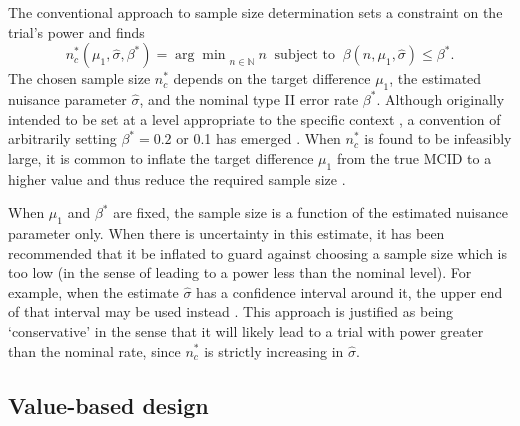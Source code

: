 \documentclass[sagev, Crown]{sagej}
\begin{document}
The conventional approach to sample size determination sets a constraint on the trial's power and finds
\begin{equation}
n^*_c (\mu_1, \hat{\sigma}, \beta^*) = {\arg\min}_{n \in \mathbb{N}}~ n ~\text{ subject to } ~ \beta(n, \mu_1, \hat{\sigma}) \leq \beta^*.
\end{equation}
The chosen sample size $n^*_c$ depends on the target difference $\mu_1$, the estimated nuisance parameter $\hat{\sigma}$, and the nominal type II error rate $\beta^*$. Although originally intended to be set at a level appropriate to the specific context \cite{}, a convention of arbitrarily setting $\beta^* = 0.2$ or 0.1 has emerged \cite{Bacchetti2019}. When $n^*_c$ is found to be infeasibly large, it is common to inflate the target difference $\mu_1$ from the true MCID to a higher value and thus reduce the required sample size \cite{Schulz2005}.

When $\mu_1$ and $\beta^*$ are fixed, the sample size is a function of the estimated nuisance parameter only. When there is uncertainty in this estimate, it has been recommended that it be inflated to guard against choosing a sample size which is too low (in the sense of leading to a power less than the nominal level). For example, when the estimate $\hat{\sigma}$ has a confidence interval around it, the upper end of that interval may be used instead \cite{Browne1995, Teare2014, Whitehead2015}. This approach is justified as being `conservative' in the sense that it will likely lead to a trial with power greater than the nominal rate, since $n^*_c$ is strictly increasing in $\hat{\sigma}$. 

\subsection{Value-based design}

\end{document}
